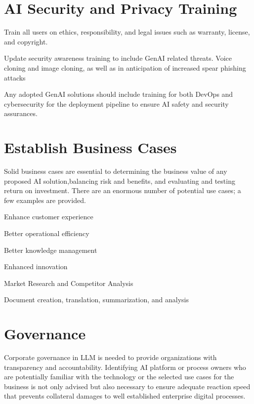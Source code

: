 \section{AI Security and Privacy Training}
\begin{minipage}{\linewidth}
\begin{checklist}
  \item Train all users on ethics, responsibility, and legal issues such as warranty, license, and copyright.
  \item Update security awareness training to include GenAI related threats. Voice cloning and image cloning, as well as in anticipation of increased spear phishing attacks
  \item Any adopted GenAI solutions should include training for both DevOps and cybersecurity for the deployment pipeline to ensure AI safety and security assurances.
\end{checklist}
\end{minipage}

\section{Establish Business Cases}
Solid business cases are essential to determining the business value of any
proposed AI solution,balancing risk and benefits, and evaluating and testing
return on investment. There are an enormous number of potential use cases; a
few examples are provided.

\begin{minipage}{\linewidth}
\begin{checklist}
  \item Enhance customer experience
  \item Better operational efficiency
  \item Better knowledge management
  \item Enhanced innovation
  \item Market Research and Competitor Analysis
  \item Document creation, translation, summarization, and analysis
\end{checklist}
\end{minipage}

\section{Governance}
Corporate governance in LLM is needed to provide organizations with transparency
and accountability. Identifying AI platform or process owners who are
potentially familiar with the technology or the selected use cases for the
business is not only advised but also necessary to ensure adequate reaction
speed that prevents collateral damages to well established enterprise digital
processes.

